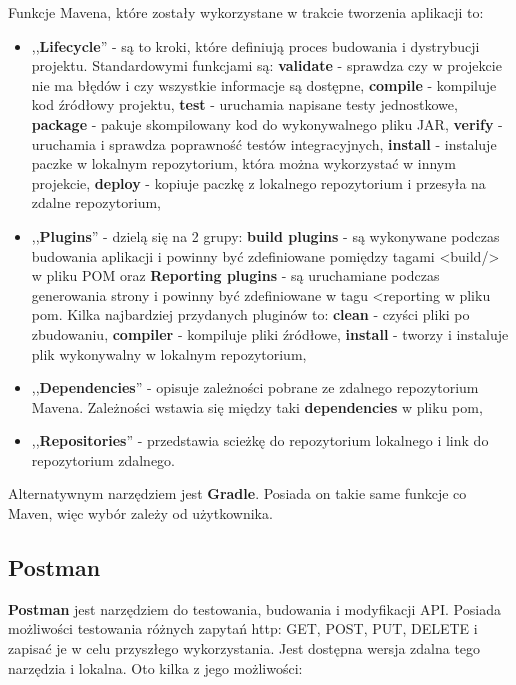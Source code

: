 \documentclass{iiuwb}
\begin{document}
Funkcje Mavena, które zostały wykorzystane w trakcie tworzenia aplikacji to: 
\begin{itemize}
\item ,,\textbf{Lifecycle}'' - są to kroki, które definiują proces budowania i dystrybucji projektu. Standardowymi funkcjami są: \textbf{validate} - sprawdza czy w projekcie nie ma błędów i czy wszystkie informacje są dostępne, \textbf{compile} - kompiluje kod źródłowy projektu, \textbf{test} - uruchamia napisane testy jednostkowe, \textbf{package} - pakuje skompilowany kod do wykonywalnego pliku JAR, \textbf{verify} - uruchamia i sprawdza poprawność testów integracyjnych, \textbf{install} - instaluje paczke w lokalnym repozytorium, która można wykorzystać w innym projekcie, \textbf{deploy} - kopiuje paczkę z lokalnego repozytorium i przesyła na zdalne repozytorium, 
\item ,,\textbf{Plugins}'' - dzielą się na 2 grupy: \textbf{build plugins} - są wykonywane podczas budowania aplikacji i powinny być zdefiniowane pomiędzy tagami <build/> w pliku POM oraz \textbf{Reporting plugins} - są uruchamiane podczas generowania strony i powinny być zdefiniowane w tagu <reporting\> w pliku pom. Kilka najbardziej przydanych pluginów to: \textbf{clean} - czyści pliki po zbudowaniu, \textbf{compiler} - kompiluje pliki źródłowe, \textbf{install} - tworzy i instaluje plik wykonywalny w lokalnym repozytorium, 
\item ,,\textbf{Dependencies}'' - opisuje zależności pobrane ze zdalnego repozytorium Mavena. Zależności wstawia się między taki \textbf{dependencies} w pliku pom, 
\item ,,\textbf{Repositories}'' - przedstawia scieżkę do repozytorium lokalnego i link do repozytorium zdalnego.
\end{itemize}

Alternatywnym narzędziem jest \textbf{Gradle}. Posiada on takie same funkcje co Maven, więc wybór zależy od użytkownika.

\subsection{Postman}
\label{sec:Postman}

\textbf{Postman} jest narzędziem do testowania, budowania i modyfikacji API. Posiada możliwości testowania różnych zapytań http: GET, POST, PUT, DELETE i zapisać je w celu przyszłego wykorzystania. Jest dostępna wersja zdalna tego narzędzia i lokalna. Oto kilka z jego możliwości:
\end{document}

